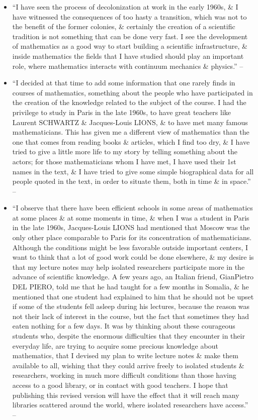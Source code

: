 \documentclass{article}
\begin{document}
\begin{enumerate}
\begin{itemize}
		\item ``I have seen the process of decolonization at work in the early 1960s, \& I have witnessed the consequences of too hasty a transition, which was not to the benefit of the former colonies, \& certainly the creation of a scientific tradition is not something that can be done very fast. I see the development of mathematics as a good way to start building a scientific infrastructure, \& inside mathematics the fields that I have studied should play an important role, where mathematics interacts with continuum mechanics \& physics.'' -- \cite[Preface, pp. ix--x]{Tartar2006}
		\item ``I decided at that time to add some information that one rarely finds in courses of mathematics, something about the people who have participated in the creation of the knowledge related to the subject of the course. I had the privilege to study in Paris in the late 1960s, to have great teachers like Laurent SCHWARTZ \& Jacques-Louis LIONS, \& to have met many famous mathematicians. This has given me a different view of mathematics than the one that comes from reading books \& articles, which I find too dry, \& I have tried to give a little more life to my story by telling something about the actors; for those mathematicians whom I have met, I have used their 1st names in the text, \& I have tried to give some simple biographical data for all people quoted in the text, in order to situate them, both in time \& in space.'' -- \cite[Preface, p. x]{Tartar2006}
		\item ``I observe that there have been efficient schools in some areas of mathematics at some places \& at some moments in time, \& when I was a student in Paris in the late 1960s, Jacques-Louis LIONS had mentioned that Moscow was the only other place comparable to Paris for its concentration of mathematicians. Although the conditions might be less favorable outside important centers, I want to think that a lot of good work could be done elsewhere, \& my desire is that my lecture notes may help isolated researchers participate more in the advance of scientific knowledge. A few years ago, an Italian friend, GianPietro DEL PIERO, told me that he had taught for a few months in Somalia, \& he mentioned that one student had explained to him that he should not be upset if some of the students fell asleep during his lectures, because the reason was not their lack of interest in the course, but the fact that sometimes they had eaten nothing for a few days. It was by thinking about these courageous students who, despite the enormous difficulties that they encounter in their everyday life, are trying to acquire some precious knowledge about mathematics, that I devised my plan to write lecture notes \& make them available to all, wishing that they could arrive freely to isolated students \& researchers, working in much more difficult conditions than those having access to a good library, or in contact with good teachers. I hope that publishing this revised version will have the effect that it will reach many libraries scattered around the world, where isolated researchers have access.'' -- \cite[Preface, p. xi]{Tartar2006}

\end{itemize}
\end{enumerate}
\end{document}
